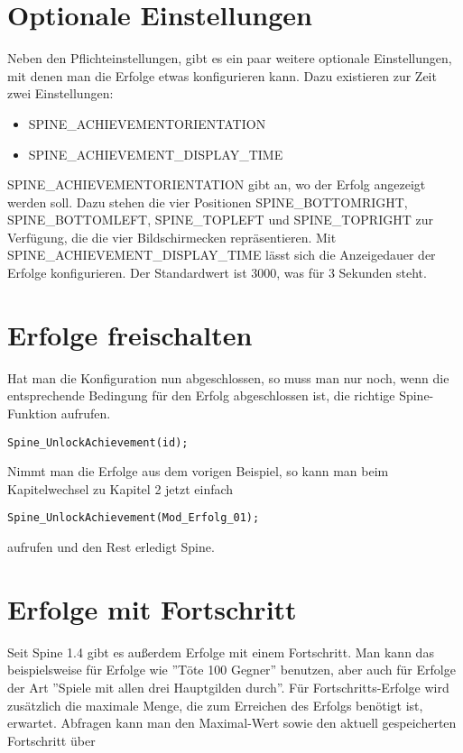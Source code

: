 \documentclass{article}
\begin{document}
\section{Optionale Einstellungen}

Neben den Pflichteinstellungen, gibt es ein paar weitere optionale Einstellungen, mit denen man die Erfolge etwas konfigurieren kann. Dazu existieren zur Zeit zwei Einstellungen:

\begin{itemize}
	\item SPINE\_ACHIEVEMENTORIENTATION
	\item SPINE\_ACHIEVEMENT\_DISPLAY\_TIME
\end{itemize}

SPINE\_ACHIEVEMENTORIENTATION gibt an, wo der Erfolg angezeigt werden soll. Dazu stehen die vier Positionen SPINE\_BOTTOMRIGHT, SPINE\_BOTTOMLEFT, SPINE\_TOPLEFT und SPINE\_TOPRIGHT zur Verfügung, die die vier Bildschirmecken repräsentieren. Mit SPINE\_ACHIEVEMENT\_DISPLAY\_TIME lässt sich die Anzeigedauer der Erfolge konfigurieren. Der Standardwert ist 3000, was für 3 Sekunden steht.

\section{Erfolge freischalten}

Hat man die Konfiguration nun abgeschlossen, so muss man nur noch, wenn die entsprechende Bedingung für den Erfolg abgeschlossen ist, die richtige Spine-Funktion aufrufen.

\begin{lstlisting}
Spine_UnlockAchievement(id);
\end{lstlisting}

Nimmt man die Erfolge aus dem vorigen Beispiel, so kann man beim Kapitelwechsel zu Kapitel 2 jetzt einfach

\begin{lstlisting}
Spine_UnlockAchievement(Mod_Erfolg_01);
\end{lstlisting}

aufrufen und den Rest erledigt Spine.

\section{Erfolge mit Fortschritt}

Seit Spine 1.4 gibt es außerdem Erfolge mit einem Fortschritt. Man kann das beispielsweise für Erfolge wie ''Töte 100 Gegner'' benutzen, aber auch für Erfolge der Art ''Spiele mit allen drei Hauptgilden durch''. Für Fortschritts-Erfolge wird zusätzlich die maximale Menge, die zum Erreichen des Erfolgs benötigt ist, erwartet. Abfragen kann man den Maximal-Wert sowie den aktuell gespeicherten Fortschritt über
\end{document}
